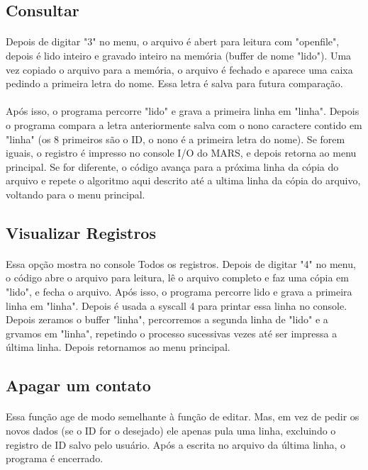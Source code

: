 \documentclass[12pt]{article}
\begin{document}
\subsection{Consultar}
    \paragraph{}
    Depois de digitar "3" no menu, o arquivo é abert para leitura com "openfile", depois é lido inteiro e gravado inteiro na memória (buffer de nome "lido"). Uma vez copiado o arquivo para a memória, o arquivo é fechado e aparece uma caixa pedindo a primeira letra do nome. Essa letra é salva para futura comparação.
    \paragraph{}
    Após isso, o programa percorre "lido" e grava a primeira linha em "linha". Depois o programa compara a letra anteriormente salva com o nono caractere contido em "linha" (os 8 primeiros são o ID, o nono é a primeira letra do nome). Se forem iguais, o registro é impresso no console I/O do MARS, e depois retorna ao menu principal. Se for diferente, o código avança para a próxima linha da cópia do arquivo e repete o algoritmo aqui descrito até a ultima linha da cópia do arquivo, voltando para o menu principal.
\subsection{Visualizar Registros}
    \paragraph{}
    Essa opção mostra no console Todos os registros. Depois de digitar "4" no menu, o código abre o arquivo para leitura, lê o arquivo completo e faz uma cópia em "lido", e fecha o arquivo.
    Após isso, o programa percorre lido e grava a primeira linha em "linha". Depois é usada a syscall 4 para printar essa linha no console. Depois zeramos o buffer "linha", percorremos a segunda linha de "lido" e a grvamos em "linha", repetindo o processo sucessivas vezes até ser impressa a última linha. Depois retornamos ao menu principal.
\subsection{Apagar um contato}
    \paragraph{}
    Essa função age de modo semelhante à função de editar. Mas, em vez de pedir os novos dados (se o ID for o desejado) ele apenas pula uma linha, excluindo o registro de ID salvo pelo usuário. Após a escrita no arquivo da última linha, o programa é encerrado. 
    
\end{document}
